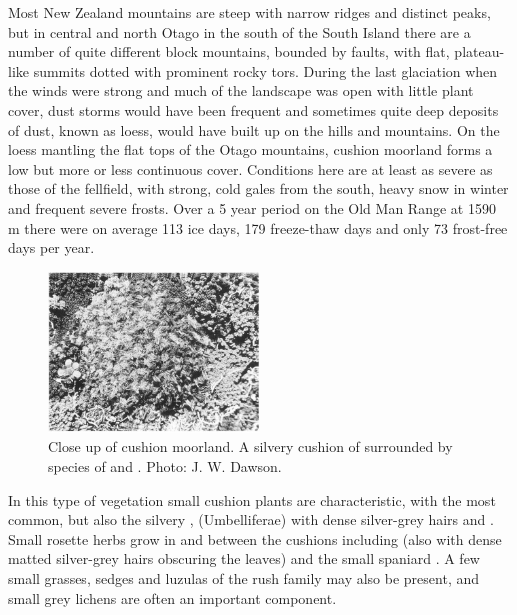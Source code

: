 Most New Zealand mountains are steep with narrow ridges and distinct peaks, but in central and north Otago in the south of the South Island there are a number of quite different block mountains, bounded by faults, with flat, plateau-like summits dotted with prominent rocky tors.
During the last glaciation when the winds were strong and much of the landscape was open with little plant cover, dust storms would have been frequent and sometimes quite deep deposits of dust, known as loess, would have built up on the hills and mountains.
On the loess mantling the flat tops of the Otago mountains, cushion moorland forms a low but more or less continuous cover.
Conditions here are at least as severe as those of the fellfield, with strong, cold gales from the south, heavy snow in winter and frequent severe frosts.
Over a 5 year period on the Old Man Range at 1590 m there were on average 113 ice days, 179 freeze-thaw days and only 73 frost-free days per year.

\begin{figure}
	\includegraphics[width=0.5\textwidth]{graphics/figure114cushion-moorland.jpg}
	\centering
	\caption[Close up of cushion moorland]{Close up of cushion moorland.
A silvery cushion of  surrounded by species of  and .
	Photo: J. W. Dawson.}%
	\label{fig:114cushion-moorland}
\end{figure}

In this type of vegetation small cushion plants are characteristic, with  the most common, but also the silvery ,  (Umbelliferae) with dense silver-grey hairs and .
Small rosette herbs grow in and between the cushions including  (also with dense matted silver-grey hairs obscuring the leaves) and the small spaniard .
A few small grasses, sedges and luzulas of the rush family may also be present, and small grey lichens are often an important component.

